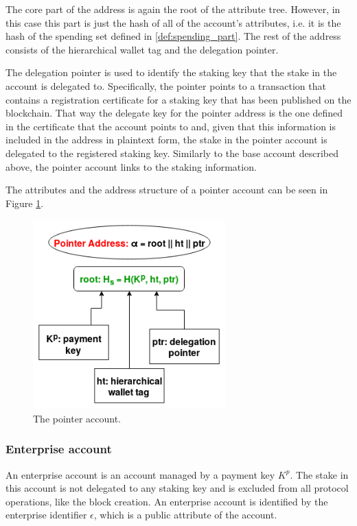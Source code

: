 The core part of the address is again the root of the attribute tree. However, in this case this part is just the hash of all of the account's attributes, i.e. it is the hash of the spending set defined in \ref{def:spending_part}. The rest of the address consists of the hierarchical wallet tag and the delegation pointer.

The delegation pointer is used to identify the staking key that the stake in the account is delegated to. Specifically, the pointer points to a transaction that contains a registration certificate for a staking key that has been published on the blockchain. That way the delegate key for the pointer address is the one defined in the certificate that the account points to and, given that this information is included in the address in plaintext form, the stake in the pointer account is delegated to the registered staking key. Similarly to the base account described above, the pointer account links to the staking information.

The attributes and the address structure of a pointer account can be seen in Figure \ref{fig:pointer_account}.

\begin{figure}
  \begin{center}
    \includegraphics[width=210pt]{figures/pointer_account.png}
  \end{center}
  \caption{The pointer account.}
  \label{fig:pointer_account}
\end{figure}

\subsubsection{Enterprise account}\label{subsubsec:enterprise_account_plain}

An enterprise account is an account managed by a payment key $K^p$. The stake in this account is not delegated to any staking key and is excluded from all protocol operations, like the block creation. An enterprise account is identified by the enterprise identifier $\epsilon$, which is a public attribute of the account.

